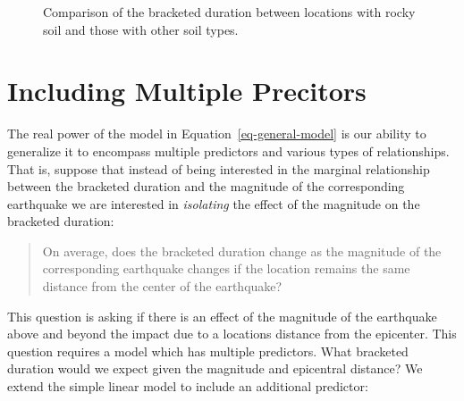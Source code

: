 \documentclass[
  letterpaper,
  DIV=11,
  numbers=noendperiod]{scrreprt}
\theoremstyle{definition}
\theoremstyle{definition}
\theoremstyle{plain}
\theoremstyle{remark}
\begin{document}
\begin{figure}


\caption{\label{fig-regextensions-ind-plot}Comparison of the bracketed
duration between locations with rocky soil and those with other soil
types.}

\end{figure}%

\section{Including Multiple
Precitors}\label{including-multiple-precitors}

The real power of the model in Equation~\ref{eq-general-model} is our
ability to generalize it to encompass multiple predictors and various
types of relationships. That is, suppose that instead of being
interested in the marginal relationship between the bracketed duration
and the magnitude of the corresponding earthquake we are interested in
\emph{isolating} the effect of the magnitude on the bracketed duration:

\begin{quote}
On average, does the bracketed duration change as the magnitude of the
corresponding earthquake changes if the location remains the same
distance from the center of the earthquake?
\end{quote}

This question is asking if there is an effect of the magnitude of the
earthquake above and beyond the impact due to a locations distance from
the epicenter. This question requires a model which has multiple
predictors. What bracketed duration would we expect given the magnitude
and epicentral distance? We extend the simple linear model to include an
additional predictor:
\end{document}
